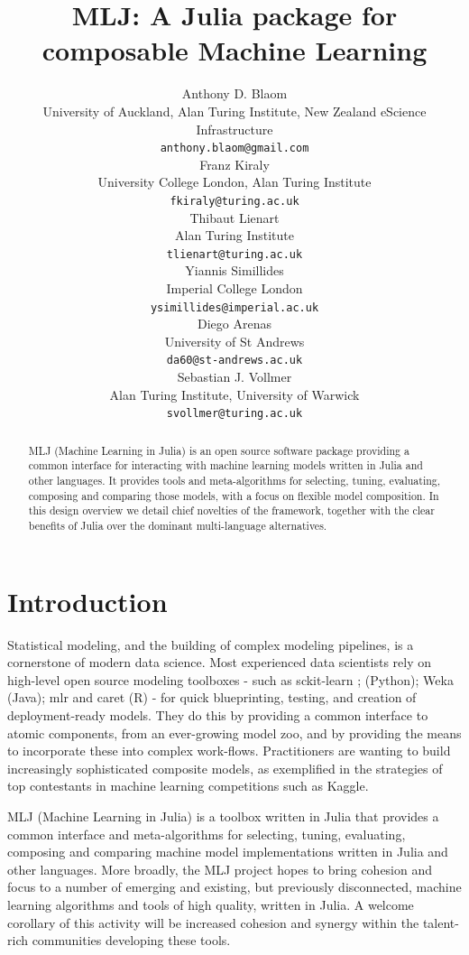 \documentclass{article}
\title{MLJ: A Julia package for composable Machine Learning}
\author{
 Anthony D. Blaom \\
  University of Auckland, Alan Turing Institute, New Zealand eScience Infrastructure\\
  \texttt{anthony.blaom@gmail.com} \\
  \And
 Franz Kiraly \\
  University College London, Alan Turing Institute\\
  \texttt{fkiraly@turing.ac.uk} \\
  \And
 Thibaut Lienart \\
  Alan Turing Institute\\
  \texttt{tlienart@turing.ac.uk} \\
  \And
 Yiannis Simillides \\
  Imperial College London\\
  \texttt{ysimillides@imperial.ac.uk} \\
  \And
 Diego Arenas \\
  University of St Andrews\\
  \texttt{da60@st-andrews.ac.uk} \\
  \And
 Sebastian J. Vollmer \\
  Alan Turing Institute, University of Warwick\\
  \texttt{svollmer@turing.ac.uk} \\
}
\begin{document}
\maketitle

\begin{abstract}
MLJ (Machine Learning in Julia) is an open source software package
providing a common interface for interacting with machine learning
models written in Julia and other languages. It provides tools and
meta-algorithms for selecting, tuning, evaluating, composing and
comparing those models, with a focus on flexible model composition. In
this design overview we detail chief novelties of the framework,
together with the clear benefits of Julia over the dominant
multi-language alternatives.
\end{abstract}


\section{Introduction}

Statistical modeling, and the building of complex modeling pipelines,
is a cornerstone of modern data science. Most experienced data
scientists rely on high-level open source modeling toolboxes - such as
sckit-learn \cite{Pedregosa2001}; \cite{Buitinck2013} (Python); Weka
\cite{Holmes1994} (Java); mlr \cite{BischlEtal2016} and caret
\cite{Kuhn2008} (R) - for quick blueprinting, testing, and creation of
deployment-ready models. They do this by providing a common interface
to atomic components, from an ever-growing model zoo, and by providing
the means to incorporate these into complex work-flows. Practitioners
are wanting to build increasingly sophisticated composite models, as
exemplified in the strategies of top contestants in machine learning
competitions such as Kaggle.

MLJ (Machine Learning in Julia) \cite{MLJdocs} is a toolbox written in
Julia that provides a common interface and meta-algorithms for
selecting, tuning, evaluating, composing and comparing machine model
implementations written in Julia and other languages. More broadly,
the MLJ project hopes to bring cohesion and focus to a number of
emerging and existing, but previously disconnected, machine learning
algorithms and tools of high quality, written in Julia. A welcome
corollary of this activity will be increased cohesion and synergy
within the talent-rich communities developing these tools.
\end{document}
